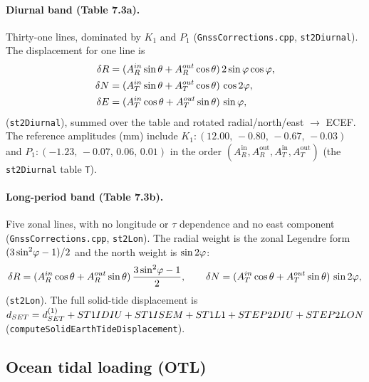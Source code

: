 \documentclass[main.tex]{subfiles}
\begin{document}
\paragraph{Diurnal band (Table 7.3a).}  Thirty-one lines, dominated by
$K_1$ and $P_1$ (\texttt{GnssCorrections.cpp}, \texttt{st2Diurnal}).  The
displacement for one line is
\begin{equation}
\begin{aligned}
\delta R &= (A^{in}_R\sin\theta + A^{out}_R\cos\theta)\,
            2\sin\varphi\cos\varphi, \\
\delta N &= (A^{in}_T\sin\theta + A^{out}_T\cos\theta)\,
            \cos 2\varphi, \\
\delta E &= (A^{in}_T\cos\theta + A^{out}_T\sin\theta)\,
            \sin\varphi,
\end{aligned}
\label{eq:sitedisp-step2diu}
\end{equation}
(\texttt{st2Diurnal}), summed over the table and
rotated radial/north/east $\to$ ECEF.  The reference amplitudes (mm)
include $K_1: (12.00,\,-0.80,\,-0.67,\,-0.03)$ and
$P_1: (-1.23,\,-0.07,\,0.06,\,0.01)$ in the order
$(A^{\mathrm{in}}_R, A^{\mathrm{out}}_R, A^{\mathrm{in}}_T, A^{\mathrm{out}}_T)$
(the \texttt{st2Diurnal} table \texttt{T}).

\paragraph{Long-period band (Table 7.3b).}  Five zonal lines, with no
longitude or $\tau$ dependence and no east component
(\texttt{GnssCorrections.cpp}, \texttt{st2Lon}).  The radial weight is the
zonal Legendre form $(3\sin^2\!\varphi - 1)/2$ and the north weight is
$\sin 2\varphi$:
\begin{equation}
\delta R = (A^{in}_R\cos\theta + A^{out}_R\sin\theta)\,
           \frac{3\sin^2\!\varphi - 1}{2},\qquad
\delta N = (A^{in}_T\cos\theta + A^{out}_T\sin\theta)\,
           \sin 2\varphi,
\label{eq:sitedisp-step2lon}
\end{equation}
(\texttt{st2Lon}).  The full solid-tide
displacement is
$d_{SET} = d_{SET}^{(1)} + ST1IDIU + ST1ISEM
+ ST1L1 + STEP2DIU + STEP2LON$
(\texttt{computeSolidEarthTideDisplacement}).

\subsection{Ocean tidal loading (OTL)}
\label{sec:sitedisp-otl}
\end{document}

